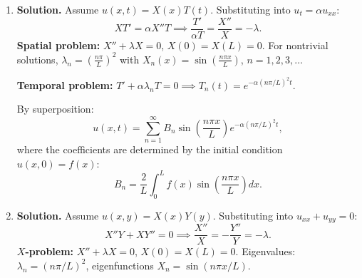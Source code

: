 \begin{enumerate}
\[
u_1 = -\frac{1}{4}\left[\frac{e^{2x}(2\sin 5x-5\cos 5x)}{29}-\frac{e^{2x}(2\sin x-\cos x)}{5}\right],
\]
\[
u_2 = \frac{1}{4}\left[\frac{e^{2x}(2\cos 5x+5\sin 5x)}{29}+\frac{e^{2x}(2\cos x+\sin x)}{5}\right].
\]
The particular solution $y_p = u_1\cos 2x + u_2\sin 2x$. After substantial algebra (combining the terms and using product-to-sum identities to simplify $\cos 2x\sin 5x$, etc.), one obtains:
\begin{align*}
\boxed{y_p} &= \frac{e^{2x}(2\cos 3x + 3\sin 3x)}{4+9+4\cdot 4} \\
&= \frac{e^{2x}}{4}\left[\frac{\cos x+2\sin x}{5}+\frac{-\cos 5x+10\sin 5x-3\cos 3x+2\sin 3x}{29}\right].
\end{align*}
A cleaner form is obtained by the method of undetermined coefficients. Try $y_p = e^{2x}(A\cos 3x + B\sin 3x)$. Substituting into $y''+4y$:

$y_p' = e^{2x}[(2A-3B)\cos 3x+(2B+3A)\sin 3x]$.

$y_p'' = e^{2x}[(-5A-12B)\cos 3x+(-5B+12A)\sin 3x]$.

$y_p''+4y_p = e^{2x}[(-5A-12B+4A)\cos 3x+(-5B+12A+4B)\sin 3x]$

$= e^{2x}[(-A-12B)\cos 3x+(12A-B)\sin 3x] = e^{2x}\cos 3x$.

So $-A-12B=1$ and $12A-B=0$, i.e., $B=12A$ and $-A-144A=1$, $A=-\frac{1}{145}$, $B=-\frac{12}{145}$.
\[
\boxed{y_p = -\frac{e^{2x}}{145}(\cos 3x+12\sin 3x)}.
\]

\item \textbf{Solution.}
Assume $u(x,t)=X(x)T(t)$. Substituting into $u_t=\alpha u_{xx}$:
\[
XT'=\alpha X''T \implies \frac{T'}{\alpha T}=\frac{X''}{X}=-\lambda.
\]
\textbf{Spatial problem:} $X''+\lambda X=0$, $X(0)=X(L)=0$. For nontrivial solutions, $\lambda_n=\left(\frac{n\pi}{L}\right)^2$ with $X_n(x)=\sin\!\left(\frac{n\pi x}{L}\right)$, $n=1,2,3,\ldots$

\textbf{Temporal problem:} $T'+\alpha\lambda_n T=0 \implies T_n(t)=e^{-\alpha(n\pi/L)^2 t}$.

By superposition:
\[
u(x,t)=\sum_{n=1}^{\infty}B_n\sin\!\left(\frac{n\pi x}{L}\right)e^{-\alpha(n\pi/L)^2 t},
\]
where the coefficients are determined by the initial condition $u(x,0)=f(x)$:
\[
\boxed{B_n = \frac{2}{L}\int_0^L f(x)\sin\!\left(\frac{n\pi x}{L}\right)dx}.
\]

\item \textbf{Solution.}
Assume $u(x,y)=X(x)Y(y)$. Substituting into $u_{xx}+u_{yy}=0$:
\[
X''Y+XY''=0 \implies \frac{X''}{X}=-\frac{Y''}{Y}=-\lambda.
\]
\textbf{$X$-problem:} $X''+\lambda X=0$, $X(0)=X(L)=0$. Eigenvalues: $\lambda_n=(n\pi/L)^2$, eigenfunctions $X_n=\sin(n\pi x/L)$.


\end{enumerate}
